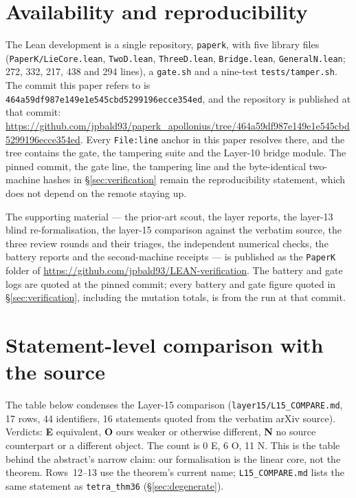 \documentclass[11pt]{article}
\theoremstyle{definition}
\theoremstyle{remark}
\newcommand{\pkcommit}{464a59df987e149e1e545cbd5299196ecce354ed}
\begin{document}
\section{Availability and reproducibility}\label{sec:availability}

The Lean development is a single repository, \texttt{paperk}, with five library files
(\texttt{PaperK/LieCore.lean}, \texttt{TwoD.lean}, \texttt{ThreeD.lean}, \texttt{Bridge.lean},
\texttt{GeneralN.lean}; 272, 332, 217, 438 and 294 lines), a \texttt{gate.sh} and a nine-test \texttt{tests/tamper.sh}. The
commit this paper refers to is \texttt{\pkcommit}, and the repository is published at that commit:
\url{https://github.com/jpbald93/paperk_apollonius/tree/464a59df987e149e1e545cbd5299196ecce354ed}.
Every \texttt{File:line} anchor in this paper resolves there, and the tree contains the gate, the
tampering suite and the Layer-10 bridge module. The pinned commit, the gate line, the tampering
line and the byte-identical two-machine hashes in \S\ref{sec:verification} remain the
reproducibility statement, which does not depend on the remote staying up.

The supporting material --- the prior-art scout, the layer reports, the layer-13 blind
re-formalisation, the layer-15 comparison against the verbatim source, the three review rounds and their
triages,
the independent numerical checks, the battery reports and the second-machine receipts --- is
published as the \texttt{PaperK} folder of
\url{https://github.com/jpbald93/LEAN-verification}. The battery and gate logs are quoted at the
pinned commit; every battery and gate figure quoted in \S\ref{sec:verification}, including the
mutation totals, is from the run at that commit.


\appendix
\section{Statement-level comparison with the source}\label{app:l15}

The table below condenses the Layer-15 comparison (\texttt{layer15/L15\_COMPARE.md}, 17 rows, 44
identifiers, 16 statements quoted from the verbatim arXiv source). Verdicts: \textbf{E} equivalent,
\textbf{O} ours weaker or otherwise different, \textbf{N} no source counterpart or a different object.
The count is 0 E, 6 O, 11 N. This is the table behind the abstract's narrow claim: our formalisation is
the linear core, not the theorem. Rows~12--13 use the theorem's current name;
\texttt{L15\_COMPARE.md} lists the same statement as \texttt{tetra\_thm36} (\S\ref{sec:degenerate}).
\end{document}

